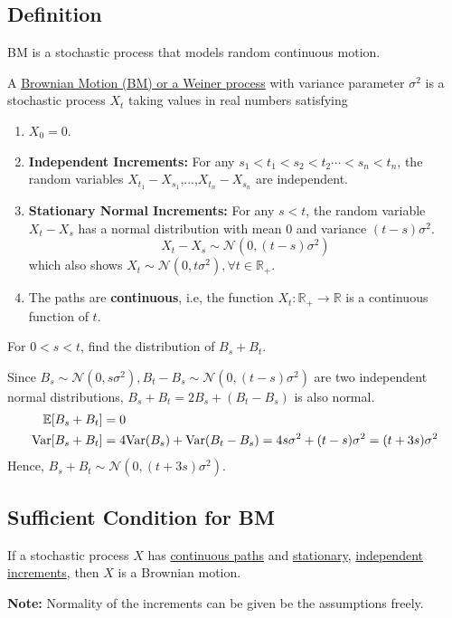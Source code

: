 \documentclass[11pt]{elegantbook}
\begin{document}
\subsection{Definition}
BM is a stochastic process that models random continuous motion.
\begin{definition}
    A \underline{Brownian Motion (BM) or a Weiner process} with variance parameter $\sigma^2$ is a stochastic process $X_t$ taking values in real numbers satisfying
    \begin{enumerate}
        \item $X_0=0$.
        \item \textbf{Independent Increments:} For any $s_1<t_1<s_2<t_2\cdots<s_n<t_n$, the random variables $X_{t_1}-X_{s_1}$,...,$X_{t_n}-X_{s_n}$ are independent.
        \item \textbf{Stationary Normal Increments:} For any $s < t$, the random variable $X_t-X_s$ has a normal distribution with mean $0$ and variance $(t-s)\sigma^2$. $$X_t-X_s\sim \mathcal{N}(0,(t-s)\sigma^2)$$
        which also shows $X_t\sim \mathcal{N}(0,t\sigma^2), \forall t\in \mathbb{R}_+$.
        \item The paths are \textbf{continuous}, i.e, the function $X_t: \mathbb{R}_+ \rightarrow  \mathbb{R}$ is a continuous function of $t$.
    \end{enumerate}
\end{definition}

\begin{example}
    For $0<s<t$, find the distribution of $B_s+B_t$.
\end{example}
\begin{solution}
    Since $B_s\sim \mathcal{N}(0,s\sigma^2), B_t-B_s\sim \mathcal{N}(0,(t-s)\sigma^2)$ are two independent normal distributions, $B_s+B_t=2B_s+(B_t-B_s)$ is also normal.
    \begin{equation}
        \begin{aligned}
            \mathbb{E}[B_s+B_t]&=0\\
            \textnormal{Var}[B_s+B_t]&=4\textnormal{Var}(B_s)+\textnormal{Var}(B_t-B_s)=4s\sigma^2+(t-s)\sigma^2=(t+3s)\sigma^2
        \end{aligned}
        \nonumber
    \end{equation}
    Hence, $B_s+B_t\sim \mathcal{N}(0,(t+3s)\sigma^2)$.
\end{solution}

\subsection{Sufficient Condition for BM}
\begin{proposition}
    If a stochastic process $X$ has \underline{continuous paths} and \underline{stationary}, \underline{independent increments}, then $X$ is a Brownian motion.
\end{proposition}
\textbf{Note:} Normality of the increments can be given be the assumptions freely.
\end{document}
